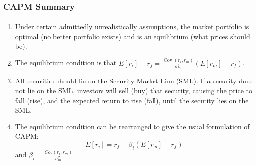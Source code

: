 \documentclass{beamer}
\begin{document}
\begin{frame}[t]
    \frametitle{CAPM Summary}
    \framesubtitle{}

    \begin{enumerate}
        \item Under certain admittedly unrealistically assumptions, the market portfolio 
        is optimal (no better portfolio exists) and is an equilibrium (what prices should be).
        \item The equilibrium condition is that 
        $E[r_i] - r_f = \frac{\operatorname{Cov}(r_i,r_m)}{\sigma_m^2}(E[r_m]-r_f)$.
        \item All securities should lie on the Security Market Line (SML).   If a security does not 
        lie on the SML, investors will sell (buy) that security, causing the price to fall (rise), and 
        the expected return to rise (fall), until the security lies on the SML.
        \item The equilibrium condition can be rearranged to give the usual formulation of CAPM:
        $$\boxed{E[r_i] = r_f + \beta_{i} (E[r_m] - r_f)}$$
        and $\beta_i = \frac{Cov(r_i,r_m)}{\sigma_m^2}$
    \end{enumerate}
\end{frame}
\end{document}
